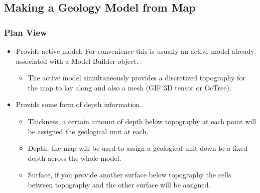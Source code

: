 \subsection{Making a Geology Model from Map}
\label{subsec:Make Geology Model from Map}

\subsubsection{Plan View}
\label{subsubsec:Make Geology Model from Map Plan View}

\begin{itemize}
\item Provide active model. For convenience this is usually an active model already associated with a Model Builder object.
\begin{itemize}
	\item The active model simultaneously provides a discretized topography for the map to lay along and also a mesh (\ac{GIF} 3D tensor or OcTree).
\end{itemize}
\item Provide some form of depth information.
\begin{itemize}
	\item Thickness, a certain amount of depth below topography at each point will be assigned the geological unit at each.
	\item Depth, the map will be used to assign a geological unit down to a fixed depth across the whole model.
	\item Surface, if you provide another surface below topography the cells between topography and the other surface will be assigned.
\end{itemize}


\end{itemize}
